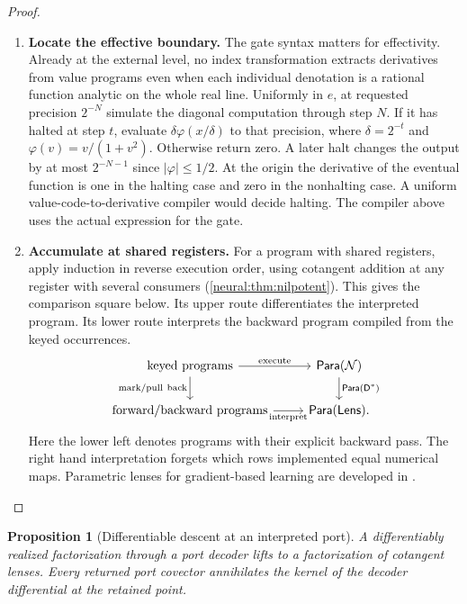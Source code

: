\documentclass[11pt,a4paper]{article}
\newtheorem{comparison}{Proposition}
\theoremstyle{definition}
\theoremstyle{remark}\newaliascnt{remark}{theorem}
\newcommand{\para}{\mathsf{Para}}
\newcommand{\lens}{\mathsf{Lens}}
\numberwithin{equation}{section}
\begin{document}
\begin{proof}
\begin{enumerate}[titledsteps]
    \item \textbf{Locate the effective boundary.} The gate syntax matters for effectivity. Already at the external level, no index transformation extracts derivatives from value programs even when each individual denotation is a rational function analytic on the whole real line. Uniformly in $e$, at requested precision $2^{-N}$ simulate the diagonal computation through step $N$. If it has halted at step $t$, evaluate $\delta\varphi(x/\delta)$ to that precision, where $\delta=2^{-t}$ and $\varphi(v)=v/(1+v^2)$. Otherwise return zero. A later halt changes the output by at most $2^{-N-1}$ since $|\varphi|\le1/2$. At the origin the derivative of the eventual function is one in the halting case and zero in the nonhalting case. A uniform value-code-to-derivative compiler would decide halting. The compiler above uses the actual expression for the gate.


    \item \textbf{Accumulate at shared registers.} For a program with shared registers, apply induction in reverse execution order, using cotangent addition at any register with several consumers (\cref{neural:thm:nilpotent}). This gives the comparison square below. Its upper route differentiates the interpreted program. Its lower route interprets the backward program compiled from the keyed occurrences.
\[
\begin{tikzcd}[column sep=normal,row sep=normal]
 \text{keyed programs}\arrow[r,"\mathrm{execute}"]\arrow[d,"\mathrm{mark/pull\ back}"']&
 \para(\mathcal N)\arrow[d,"{\para(\mathsf D^*)}"]\\
 \text{forward/backward programs}\arrow[r,"\mathrm{interpret}"']&
 \para(\lens).
\end{tikzcd}
\]
Here the lower left denotes programs with their explicit backward pass. The right hand interpretation forgets which rows implemented equal numerical maps. Parametric lenses for gradient-based learning are developed in \cite{lens:deep}.\qedhere
\end{enumerate}
\end{proof}
\begin{comparison}[Differentiable descent at an interpreted port]\label{comp:descent}
A differentiably realized factorization through a port decoder lifts to a factorization of cotangent lenses. Every returned port covector annihilates the kernel of the decoder differential at the retained point.
\end{comparison}
\end{document}
